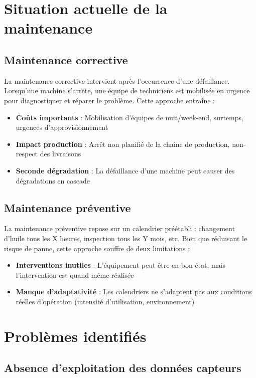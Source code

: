 \documentclass[a4paper,12pt,twoside]{report}
\begin{document}
\section{Situation actuelle de la maintenance}

\subsection{Maintenance corrective}

La maintenance corrective intervient après l'occurrence d'une défaillance. Lorsqu'une machine s'arrête, une équipe de techniciens est mobilisée en urgence pour diagnostiquer et réparer le problème. Cette approche entraîne :

\begin{itemize}
    \item \textbf{Coûts importants} : Mobilisation d'équipes de nuit/week-end, surtemps, urgences d'approvisionnement
    \item \textbf{Impact production} : Arrêt non planifié de la chaîne de production, non-respect des livraisons
    \item \textbf{Seconde dégradation} : La défaillance d'une machine peut causer des dégradations en cascade
\end{itemize}

\subsection{Maintenance préventive}

La maintenance préventive repose sur un calendrier préétabli : changement d'huile tous les X heures, inspection tous les Y mois, etc. Bien que réduisant le risque de panne, cette approche souffre de deux limitations :

\begin{itemize}
    \item \textbf{Interventions inutiles} : L'équipement peut être en bon état, mais l'intervention est quand même réalisée
    \item \textbf{Manque d'adaptativité} : Les calendriers ne s'adaptent pas aux conditions réelles d'opération (intensité d'utilisation, environnement)
\end{itemize}

\section{Problèmes identifiés}

\subsection{Absence d'exploitation des données capteurs}
\end{document}
